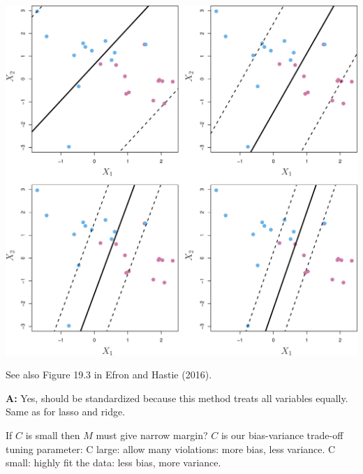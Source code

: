 \documentclass[ignorenonframetext,]{beamer}
\begin{document}
\begin{frame}

\includegraphics{../ISLR/Chapter9/9.7.png}

See also Figure 19.3 in Efron and Hastie (2016).

\end{frame}

\begin{frame}

\textbf{A:} Yes, should be standardized because this method treats all
variables equally. Same as for lasso and ridge.

If \(C\) is small then \(M\) must give narrow margin? \(C\) is our
bias-variance trade-off tuning parameter: C large: allow many
violations: more bias, less variance. C small: highly fit the data: less
bias, more variance.

\end{frame}
\end{document}

